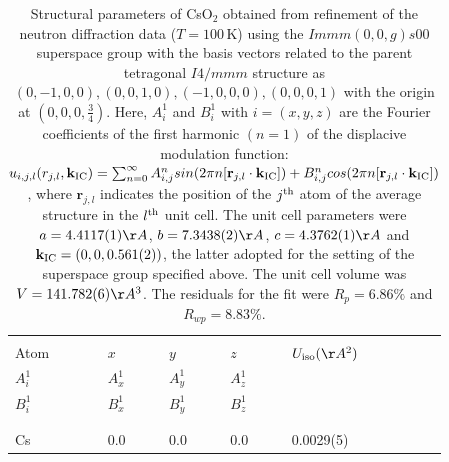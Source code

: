 \documentclass[prb,aps,twocolumn,superscriptaddress,showpacs,footinbib]{revtex4-2}
\begin{document}
\begin{table}
\caption{Structural parameters of CsO$_{2}$ obtained from refinement of the neutron diffraction data ($T = 100$\,K) using the $Immm(0,0,g)s00$ superspace group with the basis vectors related to the parent tetragonal $I4/mmm$ structure as $(0,-1,0,0),(0,0,1,0),(-1,0,0,0),(0,0,0,1)$ with the origin at $(0,0,0,\frac{3}{4})$. Here, $A_{i}^{1}$ and $B_{i}^{1}$ with $i=(x,y,z)$ are the Fourier coefficients of the first harmonic $(n = 1)$ of the displacive modulation function: $u_{i,j,l}(r_{j,l}, \mathbf{k}_{\rm{IC}})= \sum_{n=0}^{\infty} A_{i,j}^{n} sin (2 \pi n[\mathbf{r}_{j,l} \cdot  \mathbf{k}_{\rm{IC}}]) + B_{i,j}^{n} cos (2 \pi n[\mathbf{r}_{j,l} \cdot \mathbf{k}_{\rm{IC}}])$, where $\mathbf{r}_{j,l}$ indicates the position of the $j^{\rm{th}}$ atom of the average structure in the $l^{\rm{th}}$ unit cell. The unit cell parameters were $a = 4.4117(1) \AA$, $b = 7.3438(2) \AA$, $c = 4.3762(1)\AA$ and $\mathbf{k}_{\rm{IC}} = (0,0,0.561(2))$, the latter adopted for the setting of the superspace group specified above. The unit cell volume was $V = 141.782(6) \AA^{3}$. The residuals for the fit were $R_{p}=6.86\%$ and $R_{wp}=8.83\%$.}
\centering
\begin{tabular}{ p{15mm}p{17mm}p{17mm}p{17mm}p{12mm}  }
 \hline \hline
 \vspace{1mm} & \vspace{1mm} & \vspace{1mm} & \vspace{1mm} & \vspace{1mm} \\
 Atom & $x$ & $y$ & $z$ & $U_{\rm{iso}} (\AA^{2})$\\
 $A_{i}^{1}$ & $A_{x}^{1}$ & $A_{y}^{1}$ & $A_{z}^{1}$ & \\
 $B_{i}^{1}$ & $B_{x}^{1}$ & $B_{y}^{1}$ & $B_{z}^{1}$ & \\
 \vspace{1mm} & \vspace{1mm} & \vspace{1mm} & \vspace{1mm} & \vspace{1mm} \\
 \hline
 \vspace{1mm} & \vspace{1mm} & \vspace{1mm} & \vspace{1mm} & \vspace{1mm} \\
 Cs & 0.0 & 0.0 & 0.0 & 0.0029(5)\\

\end{tabular}
\end{table}
\end{document}
